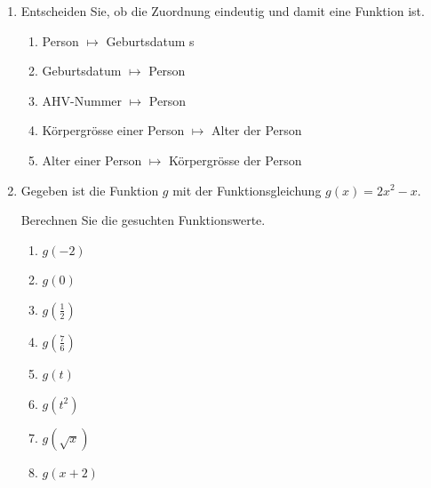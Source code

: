 \begin{ueb}
\begin{enumerate}
\begin{center}
              \end{center}

        \item Entscheiden Sie, ob die Zuordnung eindeutig und damit
              eine Funktion ist.

              \begin{enumerate}
                  \item Person \(\mapsto\) Geburtsdatum
                        s
                  \item  Geburtsdatum \(\mapsto\) Person

                  \item AHV-Nummer \(\mapsto\) Person

                  \item Körpergrösse einer Person \(\mapsto\) Alter der Person

                  \item Alter einer Person \(\mapsto\) Körpergrösse der Person

              \end{enumerate}


        \item Gegeben ist die Funktion \(g\) mit der Funktionsgleichung
              \(g(x)=2x^2-x\).

              Berechnen Sie die gesuchten Funktionswerte.

              \begin{enumerate}
                  \item \(g(-2)\)
                  \item \(g(0)\)
                  \item \(g\left(\frac{1}{2}\right)\)
                  \item \(g\left(\frac{7}{6}\right)\)
                  \item \(g(t)\)
                  \item \(g(t^2)\)
                  \item \(g(\sqrt{x})\)
                  \item \(g(x+2)\)
              \end{enumerate}




\end{enumerate}
\end{ueb}

